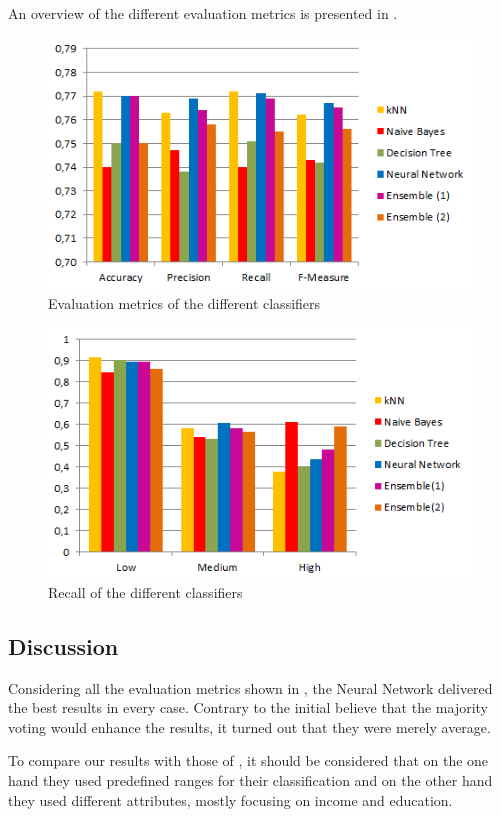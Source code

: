 An overview of the different evaluation metrics is presented in .
\begin{figure}[H]
	\centering
	\includegraphics[width=\columnwidth]{../../charts/results.png}
	\caption{Evaluation metrics of the different classifiers}
	\label{fig:result}
\end{figure}

\begin{figure}[H]
	\centering
	\includegraphics[width=\columnwidth]{../../charts/recall.png}
	\caption{Recall of the different classifiers}
	\label{fig:recall}
\end{figure}

\subsection{Discussion}

Considering all the evaluation metrics shown in , the Neural Network delivered the best results in every case. Contrary to the initial believe that the majority voting would enhance the results, it turned out that they were merely average. 
 
To compare our results with those of \cite{indian}, it should be considered that on the one hand they used predefined ranges for their classification and on the other hand they used different attributes, mostly focusing on income and education.



